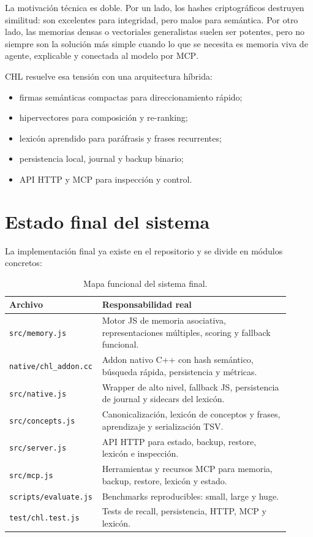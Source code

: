 \documentclass[11pt]{article}
\newcommand{\CHL}{\textsc{CHL}}
\newcommand{\MCP}{\textsc{MCP}}
\begin{document}
La motivación técnica es doble. Por un lado, los hashes criptográficos destruyen similitud: son excelentes para integridad, pero malos para semántica. Por otro lado, las memorias densas o vectoriales generalistas suelen ser potentes, pero no siempre son la solución más simple cuando lo que se necesita es memoria viva de agente, explicable y conectada al modelo por \MCP{}.

\CHL{} resuelve esa tensión con una arquitectura híbrida:
\begin{itemize}
  \item firmas semánticas compactas para direccionamiento rápido;
  \item hipervectores para composición y re-ranking;
  \item lexicón aprendido para paráfrasis y frases recurrentes;
  \item persistencia local, journal y backup binario;
  \item API HTTP y \MCP{} para inspección y control.
\end{itemize}

\section{Estado final del sistema}

La implementación final ya existe en el repositorio y se divide en módulos concretos:

\begin{table}[h]
\centering
\small
\begin{tabular}{p{0.25\linewidth}p{0.66\linewidth}}
\toprule
\textbf{Archivo} & \textbf{Responsabilidad real} \\
\midrule
\texttt{src/memory.js} & Motor JS de memoria asociativa, representaciones múltiples, scoring y fallback funcional. \\
\texttt{native/chl\_addon.cc} & Addon nativo C++ con hash semántico, búsqueda rápida, persistencia y métricas. \\
\texttt{src/native.js} & Wrapper de alto nivel, fallback JS, persistencia de journal y sidecars del lexicón. \\
\texttt{src/concepts.js} & Canonicalización, lexicón de conceptos y frases, aprendizaje y serialización TSV. \\
\texttt{src/server.js} & API HTTP para estado, backup, restore, lexicón e inspección. \\
\texttt{src/mcp.js} & Herramientas y recursos \MCP{} para memoria, backup, restore, lexicón y estado. \\
\texttt{scripts/evaluate.js} & Benchmarks reproducibles: small, large y huge. \\
\texttt{test/chl.test.js} & Tests de recall, persistencia, HTTP, \MCP{} y lexicón. \\
\bottomrule
\end{tabular}
\caption{Mapa funcional del sistema final.}
\end{table}
\end{document}
